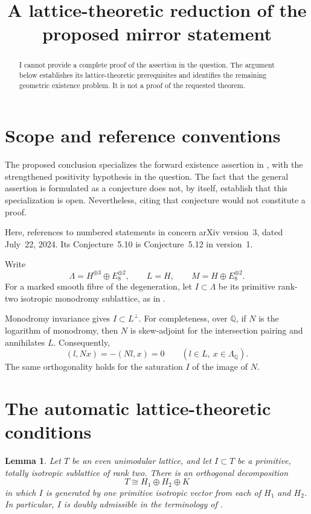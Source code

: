 \documentclass[11pt]{amsart}
\title{A lattice-theoretic reduction of the proposed mirror statement}
\author{}
\date{}
\newcommand{\Q}{\mathbb Q}
\newtheorem{lemma}{Lemma}[section]
\theoremstyle{remark}
\begin{document}
\maketitle

\begin{abstract}
I cannot provide a complete proof of the assertion in the question.
The argument below establishes its lattice-theoretic prerequisites and
identifies the remaining geometric existence problem.  It is not a proof
of the requested theorem.
\end{abstract}

\section{Scope and reference conventions}

The proposed conclusion specializes the forward existence assertion in
\cite[Conjecture~5.10]{GT24}, with the strengthened positivity hypothesis
in the question.
The fact that the general assertion is formulated as a conjecture does
not, by itself, establish that this specialization is open.
Nevertheless, citing that conjecture would not constitute a proof.

Here, references to numbered statements in \cite{GT24} concern
arXiv version~3, dated July~22, 2024.  Its Conjecture~5.10 is
Conjecture~5.12 in version~1.

Write
\[
 \Lambda=H^{\oplus 3}\oplus E_8^{\oplus 2},
 \qquad L=H,
 \qquad M=H\oplus E_8^{\oplus 2}.
\]
For a marked smooth fibre of the degeneration, let
\(I\subset\Lambda\) be its primitive rank-two isotropic monodromy
sublattice, as in \cite[Section~3.1]{GT24}.

Monodromy invariance gives \(I\subset L^\perp\).
For completeness, over \(\Q\), if \(N\) is the logarithm of monodromy,
then \(N\) is skew-adjoint for the intersection pairing and annihilates
\(L\).  Consequently,
\[
 (l,Nx)=-(Nl,x)=0
 \qquad(l\in L,\ x\in\Lambda_\Q).
\]
The same orthogonality holds for the saturation \(I\) of the image of
\(N\).

\section{The automatic lattice-theoretic conditions}

\begin{lemma}\label{lem:split}
Let \(T\) be an even unimodular lattice, and let
\(I\subset T\) be a primitive, totally isotropic sublattice of rank two.
There is an orthogonal decomposition
\[
 T\cong H_1\oplus H_2\oplus K
\]
in which \(I\) is generated by one primitive isotropic vector from each
of \(H_1\) and \(H_2\).
In particular, \(I\) is doubly admissible in the terminology of
\cite[Definition~3.31]{GT24}.
\end{lemma}
\end{document}
